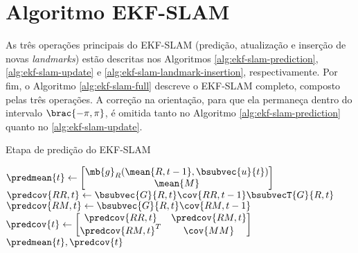 \section{Algoritmo EKF-SLAM}
\label{app:alg-ekf-slam}
As três operações principais do EKF-SLAM (predição, atualização e inserção de novas \textit{landmarks}) estão descritas nos Algoritmos \ref{alg:ekf-slam-prediction}, \ref{alg:ekf-slam-update} e \ref{alg:ekf-slam-landmark-insertion}, respectivamente. Por fim, o Algoritmo \ref{alg:ekf-slam-full} descreve o EKF-SLAM completo, composto pelas três operações. A correção na orientação, para que ela permaneça dentro do 
intervalo $\brac{-\pi, \pi}$, é omitida tanto no Algoritmo \ref{alg:ekf-slam-prediction} quanto no \ref{alg:ekf-slam-update}.

\begin{algorithm}
  \caption{Etapa de predição do EKF-SLAM}
  \label{alg:ekf-slam-prediction}
\begin{algorithmic}[1]
  \State $\predmean{t} \gets \begin{bmatrix}
    \mb{g}_R(\mean{R,t-1}, \bsubvec{u}{t}) \\ \mean{M}
  \end{bmatrix}$
  \State $\predcov{RR,t} \gets \bsubvec{G}{R, t}\cov{RR, t-1} \bsubvecT{G}{R,t}$
  \State $\predcov{RM, t} \gets \bsubvec{G}{R, t} \cov{RM, t-1}$
  \State $\predcov{t} \gets \begin{bmatrix}
    \predcov{RR, t} & \predcov{RM, t} \\
    \predcov{RM, t}^T & \cov{MM}
  \end{bmatrix}$
  \State \Return $\predmean{t}, \predcov{t}$
\EndProcedure
\end{algorithmic}
\end{algorithm}

